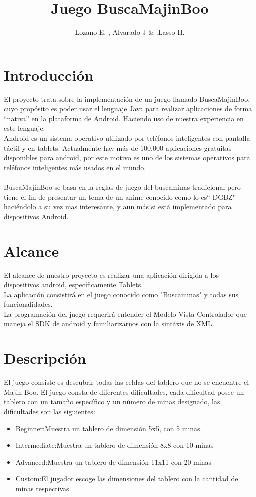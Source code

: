 \documentclass[11pt]{article} %
\title{Juego BuscaMajinBoo}
\author{Lozano E. , Alvarado J \& .Lasso H.}
\begin{document}
\maketitle

\section{Introducción}
El proyecto trata sobre la implementación  de un juego llamado BuscaMajinBoo, cuyo propósito es poder usar el lenguaje Java  para  realizar aplicaciones de forma ``nativa” en la plataforma de Android. Haciendo uso de nuestra experiencia en este lenguaje.\\
Android es un sistema operativo utilizado por  teléfonos inteligentes con pantalla táctil y en tablets. Actualmente hay más de 100.000  aplicaciones gratuitas disponibles para android, por este motivo es uno de los sistemas operativos para teléfonos inteligentes  más usados en el mundo.\\ \\
BuscaMajinBoo se basa en la reglas de juego del buscaminas tradicional pero tiene el fin de presentar un tema de un anime conocido como lo es`` DGBZ" haciéndolo a su vez mas interesante, y aun más si está implementado para dispositivos Android.

\section{Alcance}
El alcance de nuestro proyecto es realizar una aplicación dirigida a los dispositivos android, específicamente Tablets. \\
La aplicación consistirá en el juego conocido como "Buscaminas" y todas sus funcionalidades.\\
La programación del juego requerirá entender el Modelo Vista Controlador que maneja el SDK de android y familiarizarnos con la sintáxis de XML. 

\section{Descripción}
El juego consiste es descubrir todas las celdas del tablero que no se encuentre el Majin  Boo.
El juego consta de  diferentes dificultades, cada dificultad posee un tablero con un tamaño específico y un número de minas designado, las dificultades son las siguientes:\\
\begin{itemize}
\item Beginner:Muestra un tablero de dimensión 5x5, con 5 minas.\\
\item Intermediate:Muestra un tablero de dimensión 8x8 con 10 minas\\
\item Advanced:Muestra un tablero de dimensión 11x11 con 20 minas \\
\item  Custom:El jugador escoge las dimensiones del tablero con la cantidad de minas respectivas\\
\end{itemize}
\end{document}
